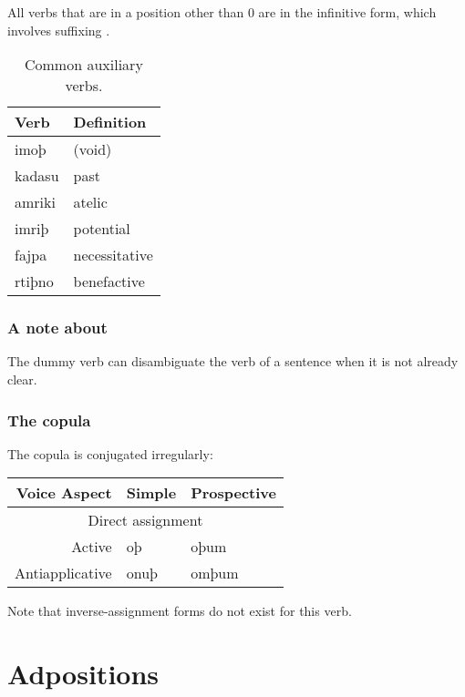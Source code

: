 \documentclass{book}
\begin{document}
All verbs that are in a position other than 0 are in the infinitive form, which involves suffixing .

\begin{table}
  \caption{Common auxiliary verbs.}
  \centering
  \begin{tabular}{ll}
    Verb & Definition \\
    \hline
    imoþ & (void) \\
    kadasu & past \\
    amriki & atelic \\
    imriþ & potential \\
    fajpa & necessitative \\
    rtiþno & benefactive \\
  \end{tabular}
\end{table}

\subsection{A note about }

The dummy verb  can disambiguate the verb of a sentence when it is not already clear.

\subsection{The copula}

The copula  is conjugated irregularly:

\begin{tablenf}
  \caption{Conjugations of .}
  \centering
  \begin{tabular}{r|ll}
    Voice \bs{} Aspect & Simple & Prospective \\
    \hline
    \multicolumn{3}{c}{Direct assignment} \\
    \hline
    Active & oþ & oþum \\
    Antiapplicative & onuþ & omþum \\
  \end{tabular}
\end{tablenf}

Note that inverse-assignment forms do not exist for this verb.

\chapter{Adpositions}
\end{document}
